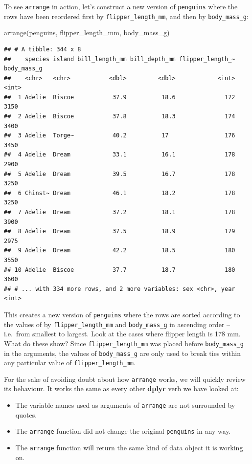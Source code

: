 \documentclass[
]{book}
\newenvironment{Shaded}{\begin{snugshade}}{\end{snugshade}}
\newcommand{\FunctionTok}[1]{\textcolor[rgb]{0.00,0.00,0.00}{#1}}
\newcommand{\NormalTok}[1]{#1}
\providecommand{\tightlist}{%
  \setlength{\itemsep}{0pt}\setlength{\parskip}{0pt}}
\begin{document}
To see \texttt{arrange} in action, let's construct a new version of \texttt{penguins} where the rows have been reordered first by \texttt{flipper\_length\_mm}, and then by \texttt{body\_mass\_g}:

\begin{Shaded}
\begin{Highlighting}[]
\FunctionTok{arrange}\NormalTok{(penguins, flipper\_length\_mm, body\_mass\_g)}
\end{Highlighting}
\end{Shaded}

\begin{verbatim}
## # A tibble: 344 x 8
##    species island bill_length_mm bill_depth_mm flipper_length_~ body_mass_g
##    <chr>   <chr>           <dbl>         <dbl>            <int>       <int>
##  1 Adelie  Biscoe           37.9          18.6              172        3150
##  2 Adelie  Biscoe           37.8          18.3              174        3400
##  3 Adelie  Torge~           40.2          17                176        3450
##  4 Adelie  Dream            33.1          16.1              178        2900
##  5 Adelie  Dream            39.5          16.7              178        3250
##  6 Chinst~ Dream            46.1          18.2              178        3250
##  7 Adelie  Dream            37.2          18.1              178        3900
##  8 Adelie  Dream            37.5          18.9              179        2975
##  9 Adelie  Dream            42.2          18.5              180        3550
## 10 Adelie  Biscoe           37.7          18.7              180        3600
## # ... with 334 more rows, and 2 more variables: sex <chr>, year <int>
\end{verbatim}

This creates a new version of \texttt{penguins} where the rows are sorted according to the values of by \texttt{flipper\_length\_mm} and \texttt{body\_mass\_g} in ascending order -- i.e.~from smallest to largest. Look at the cases where flipper length is 178 mm. What do these show? Since \texttt{flipper\_length\_mm} was placed before \texttt{body\_mass\_g} in the arguments, the values of \texttt{body\_mass\_g} are only used to break ties within any particular value of \texttt{flipper\_length\_mm}.

For the sake of avoiding doubt about how \texttt{arrange} works, we will quickly review its behaviour. It works the same as every other \textbf{dplyr} verb we have looked at:

\begin{itemize}
\tightlist
\item
  The variable names used as arguments of \texttt{arrange} are not surrounded by quotes.
\item
  The \texttt{arrange} function did not change the original \texttt{penguins} in any way.
\item
  The \texttt{arrange} function will return the same kind of data object it is working on.
\end{itemize}
\end{document}
